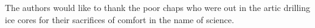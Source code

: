 The authors would like to thank the poor chaps who were out in the artic drilling ice cores for their sacrifices of comfort in the name of science.
